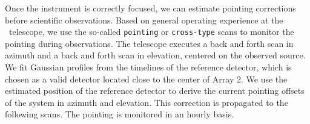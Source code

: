 Once the instrument is correctly focused, we can estimate pointing corrections
before scientific observations.
%
%
%
%
Based on general operating experience at the \trentemetre\ telescope, we use the so-called
{\tt pointing} or {\tt cross-type} scans to monitor the pointing during observations. The
telescope executes a back and forth scan in azimuth and a back and forth scan in
elevation, centered on the observed source. We fit Gaussian profiles
from the timelines of the reference detector, which is chosen as a
valid detector located close to the center of Array 2. We use the
estimated position of the reference detector to derive the current pointing
offsets of the system in azimuth and elevation. This correction is
propagated to the following scans. The pointing is monitored in an
hourly basis.


